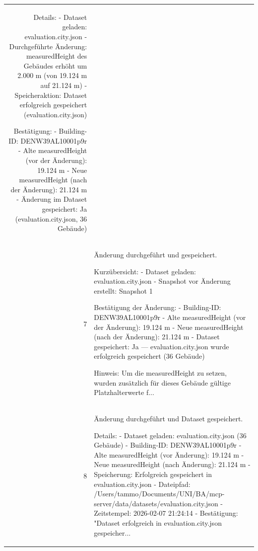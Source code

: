 \documentclass[a4paper,11pt]{article}
\begin{document}
\begin{table}[ht]
\begin{tabular}{r p{12cm}}
Details:
- Dataset geladen: evaluation.city.json
- Durchgeführte Änderung: measuredHeight des Gebäudes erhöht um 2.000 m (von 19.124 m auf 21.124 m)
- Speicheraktion: Dataset erfolgreich gespeichert (evaluation.city.json)

Bestätigung:
- Building-ID: DENW39AL10001p9r
- Alte measuredHeight (vor der Änderung): 19.124 m
- Neue measuredHeight (nach der Änderung): 21.124 m
- Änderung im Dataset gespeichert: Ja (evaluation.city.json, 36 Gebäude) \\
7 & Änderung durchgeführt und gespeichert.

Kurzübersicht:
- Dataset geladen: evaluation.city.json
- Snapshot vor Änderung erstellt: Snapshot 1

Bestätigung der Änderung:
- Building-ID: DENW39AL10001p9r
- Alte measuredHeight (vor der Änderung): 19.124 m
- Neue measuredHeight (nach der Änderung): 21.124 m
- Dataset gespeichert: Ja — evaluation.city.json wurde erfolgreich gespeichert (36 Gebäude)

Hinweis: Um die measuredHeight zu setzen, wurden zusätzlich für dieses Gebäude gültige Platzhalterwerte f... \\
8 & Änderung durchgeführt und Dataset gespeichert.

Details:
- Dataset geladen: evaluation.city.json (36 Gebäude)
- Building-ID: DENW39AL10001p9r
- Alte measuredHeight (vor Änderung): 19.124 m
- Neue measuredHeight (nach Änderung): 21.124 m
- Speicherung: Erfolgreich gespeichert in evaluation.city.json
  - Dateipfad: /Users/tammo/Documents/UNI/BA/mcp-server/data/datasets/evaluation.city.json
  - Zeitstempel: 2026-02-07 21:24:14
  - Bestätigung: "Dataset erfolgreich in evaluation.city.json gespeicher... \\
\hline
\end{tabular}
\end{table}

\clearpage
\end{document}
